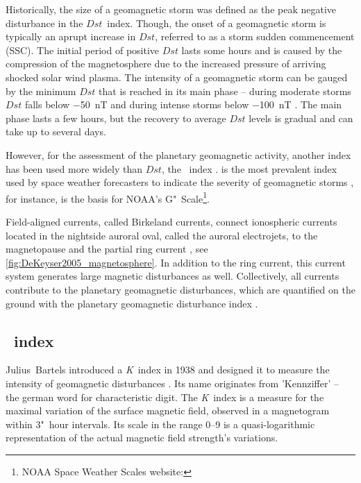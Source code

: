 Historically, the size of a geomagnetic storm was defined as the peak negative disturbance in the $Dst$~index. Though, the onset of a geomagnetic storm is typically an aprupt increase in $Dst$, referred to as a storm sudden commencement (SSC). The initial period of positive $Dst$ lasts some hours and is caused by the compression of the magnetosphere due to the increased pressure of arriving shocked solar wind plasma. The intensity of a geomagnetic storm can be gauged by the minimum $Dst$ that is reached in its main phase -- during moderate storms $Dst$ falls below \SI{-50}{\nano\tesla} and during intense storms below \SI{-100}{\nano\tesla} \citep{Gonzalez1994}. The main phase lasts a few hours, but the recovery to average $Dst$ levels is gradual and can take up to several days.

However, for the assessment of the planetary geomagnetic activity, another index has been used more widely than $Dst$, the \Kp~index \citep{Gonzalez1994}. \Kp{} is the most prevalent index used by space weather forecasters to indicate the severity of geomagnetic storms \citep{Wing2005}, for instance, \Kp{} is the basis for NOAA's G"~Scale\footnote{NOAA Space Weather Scales website: }.

Field-aligned currents, called Birkeland currents, connect ionospheric currents located in the nightside auroral oval, called the auroral electrojets, to the magnetopause and the partial ring current \citep{Coxon2014}, see \autoref{fig:DeKeyser2005_magnetosphere}. In addition to the ring current, this current system generates large magnetic disturbances as well. Collectively, all currents contribute to the planetary geomagnetic disturbances, which are quantified on the ground with the planetary geomagnetic disturbance index \Kp{}.


\subsection{\Kp{}~index}
\label{sec:kp_index}
Julius~Bartels introduced a \textit{K}~index in 1938 and designed it to measure the intensity of geomagnetic disturbances \citep{Bartels1939}. Its name originates from 'Kennziffer' -- the german word for characteristic digit. The \textit{K}~index is a measure for the maximal variation of the surface magnetic field, observed in a magnetogram within 3"~hour intervals. Its scale in the range 0--9 is a quasi-logarithmic representation of the actual magnetic field strength's variations.

